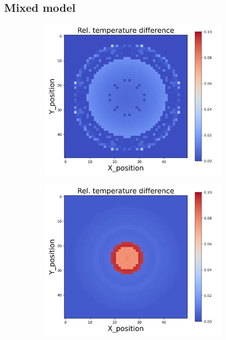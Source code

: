 {\subsection{Mixed model}
\begin{figure}[h]
    \centering
    \begin{minipage}{\textwidth}
        \centering
        \begin{subfigure}{0.27\textwidth}
            \centering
            \includegraphics[width=\textwidth]{figures/raw_data/0/mix/T_bias.jpg}
        \end{subfigure}
        \begin{subfigure}{0.27\textwidth}
            \centering
            \includegraphics[width=\textwidth]{figures/raw_data/5/mix/T_bias.jpg}

\end{subfigure}
\end{minipage}
\end{figure}}
